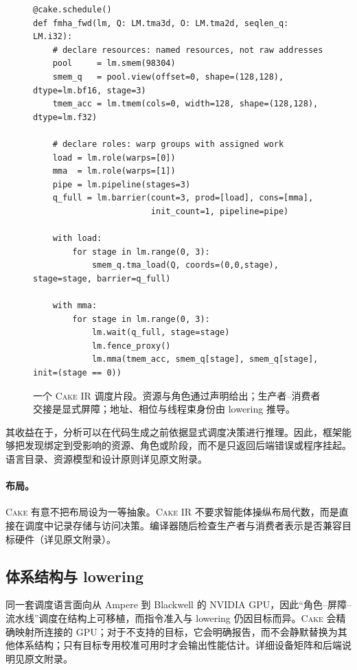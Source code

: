 \documentclass[10pt]{article}
\newcommand{\cake}{\textsc{Cake}}
\newcommand{\cakeir}{\textsc{Cake IR}}
\begin{document}
\begin{figure}[t]
\begin{lstlisting}
@cake.schedule()
def fmha_fwd(lm, Q: LM.tma3d, O: LM.tma2d, seqlen_q: LM.i32):
    # declare resources: named resources, not raw addresses
    pool     = lm.smem(98304)
    smem_q   = pool.view(offset=0, shape=(128,128), dtype=lm.bf16, stage=3)
    tmem_acc = lm.tmem(cols=0, width=128, shape=(128,128), dtype=lm.f32)

    # declare roles: warp groups with assigned work
    load = lm.role(warps=[0])
    mma  = lm.role(warps=[1])
    pipe = lm.pipeline(stages=3)
    q_full = lm.barrier(count=3, prod=[load], cons=[mma],
                        init_count=1, pipeline=pipe)

    with load:
        for stage in lm.range(0, 3):
            smem_q.tma_load(Q, coords=(0,0,stage), stage=stage, barrier=q_full)

    with mma:
        for stage in lm.range(0, 3):
            lm.wait(q_full, stage=stage)
            lm.fence_proxy()
            lm.mma(tmem_acc, smem_q[stage], smem_q[stage], init=(stage == 0))
\end{lstlisting}
\caption{一个 \cakeir{} 调度片段。资源与角色通过声明给出；生产者--消费者交接是显式屏障；地址、相位与线程束身份由 lowering 推导。}
\label{fig:ir-example}
\end{figure}

其收益在于，分析可以在代码生成之前依据显式调度决策进行推理。因此，框架能够把发现绑定到受影响的资源、角色或阶段，而不是只返回后端错误或程序挂起。语言目录、资源模型和设计原则详见原文附录。

\paragraph{布局。}
\cake{} 有意不把布局设为一等抽象。\cakeir{} 不要求智能体操纵布局代数，而是直接在调度中记录存储与访问决策。编译器随后检查生产者与消费者表示是否兼容目标硬件（详见原文附录）。

\subsection{体系结构与 lowering}
\label{sec:arch}

同一套调度语言面向从 Ampere 到 Blackwell 的 NVIDIA GPU，因此“角色--屏障--流水线”调度在结构上可移植，而指令准入与 lowering 仍因目标而异。\cake{} 会精确映射所连接的 GPU；对于不支持的目标，它会明确报告，而不会静默替换为其他体系结构；只有目标专用校准可用时才会输出性能估计。详细设备矩阵和后端说明见原文附录。
\end{document}
